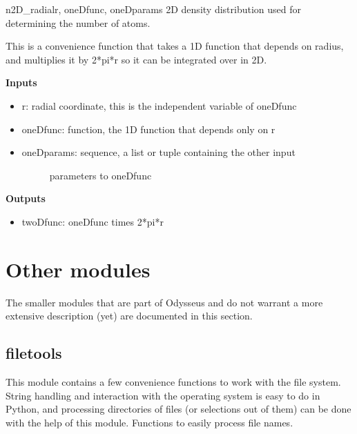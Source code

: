 \documentclass[letterpaper,10pt,english]{manual}
\begin{document}
\hypertarget{odysseus.fitfuncs.n2D_radial}{}\begin{funcdesc}{n2D\_radial}{r, oneDfunc, oneDparams}
2D density distribution used for determining the number of atoms.

This is a convenience function that takes a 1D function that depends on
radius, and multiplies it by 2*pi*r so it can be integrated over in 2D.

\textbf{Inputs}
\begin{itemize}
\item {} 
r: radial coordinate, this is the independent variable of oneDfunc

\item {} 
oneDfunc: function, the 1D function that depends only on r

\item {} \begin{description}
\item[oneDparams: sequence, a list or tuple containing the other input] \leavevmode
parameters to oneDfunc

\end{description}

\end{itemize}

\textbf{Outputs}
\begin{itemize}
\item {} 
twoDfunc: oneDfunc times 2*pi*r

\end{itemize}
\end{funcdesc}

\resetcurrentobjects
\hypertarget{--doc-othermodules}{}

\section{Other modules}

The smaller modules that are part of Odysseus and do not warrant a more extensive description (yet) are documented in this section.


\subsection{filetools}

This module contains a few convenience functions to work with the file system. String handling and interaction with the operating system is easy to do in Python, and processing directories of files (or selections out of them) can be done with the help of this module.
\hypertarget{module-odysseus.filetools}{}
\modulesynopsis{}
Functions to easily process file names.
\end{document}

